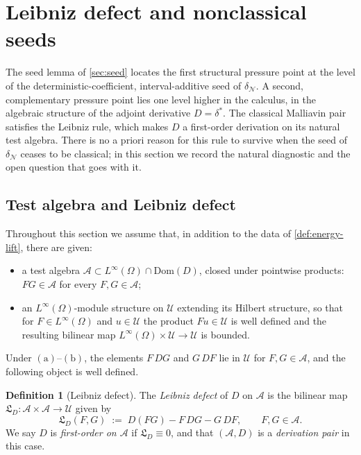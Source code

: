 \documentclass[11pt,reqno]{amsart}
\theoremstyle{plain}
\theoremstyle{definition}
\newtheorem{definition}[theorem]{Definition}
\theoremstyle{remark}
\newcommand{\Dom}{\mathrm{Dom}}
\begin{document}
\section{Leibniz defect and nonclassical seeds}\label{sec:leibniz}

The seed lemma of \cref{sec:seed} locates the first structural
pressure point at the level of the deterministic-coefficient,
interval-additive seed of $\delta_{\mathcal N}$. A second,
complementary pressure point lies one level higher in the calculus,
in the algebraic structure of the adjoint derivative
$D=\delta^{*}$. The classical Malliavin pair satisfies the Leibniz
rule, which makes $D$ a first-order derivation on its natural test
algebra. There is no a priori reason for this rule to survive when
the seed of $\delta_{\mathcal N}$ ceases to be classical; in this
section we record the natural diagnostic and the open question that
goes with it.

\subsection{Test algebra and Leibniz defect}\label{sec:leibniz-defect}

Throughout this section we assume that, in addition to the data of
\cref{def:energy-lift}, there are given:
\begin{itemize}
\item[$(\mathrm a)$] a test algebra
$\mathcal A\subset L^\infty(\Omega)\cap\Dom(D)$, closed under
pointwise products: $FG\in\mathcal A$ for every $F,G\in\mathcal A$;
\item[$(\mathrm b)$] an $L^\infty(\Omega)$-module structure on
$\mathcal U$ extending its Hilbert structure, so that for
$F\in L^\infty(\Omega)$ and $u\in\mathcal U$ the product
$Fu\in\mathcal U$ is well defined and the resulting bilinear map
$L^\infty(\Omega)\times\mathcal U\to\mathcal U$ is bounded.
\end{itemize}
Under $(\mathrm a)$--$(\mathrm b)$, the elements $F\,DG$ and $G\,DF$
lie in $\mathcal U$ for $F,G\in\mathcal A$, and the following object
is well defined.

\begin{definition}[Leibniz defect]\label{def:leibniz-defect}
The \emph{Leibniz defect} of $D$ on $\mathcal A$ is the bilinear map
$\mathfrak L_D\colon\mathcal A\times\mathcal A\to\mathcal U$ given by
\begin{equation}\label{eq:leibniz-defect}
  \mathfrak L_D(F,G)\;:=\;D(FG)-F\,DG-G\,DF,
  \qquad F,G\in\mathcal A.
\end{equation}
We say $D$ is \emph{first-order on $\mathcal A$} if
$\mathfrak L_D\equiv 0$, and that $(\mathcal A,D)$ is a
\emph{derivation pair} in this case.
\end{definition}
\end{document}

